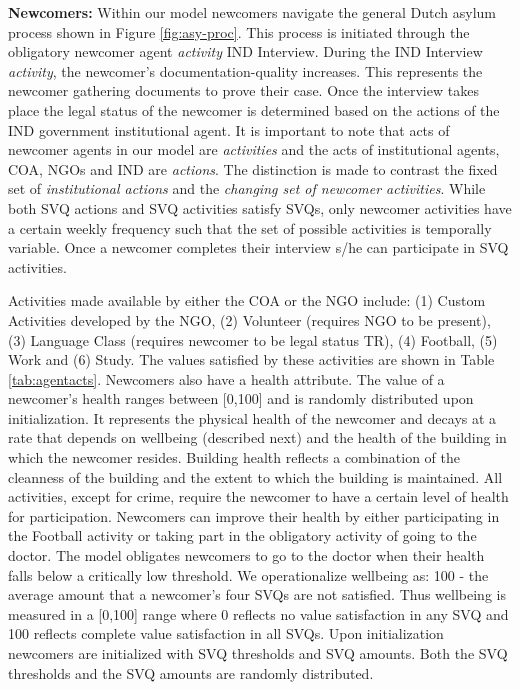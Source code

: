 \documentclass{scspaperproc}
\theoremstyle{scsthe}
\begin{document}
{\bf Newcomers:} Within our model newcomers navigate the general Dutch asylum process shown in Figure \ref{fig:asy-proc}. This process is initiated through the obligatory newcomer agent \emph{activity} IND Interview. During the IND Interview \emph{activity}, the newcomer's documentation-quality increases. This represents the newcomer gathering documents to prove their case. Once the interview takes place the legal status of the newcomer is determined based on the actions of the IND government institutional agent. It is important to note that acts of newcomer agents in our model are \emph{activities} and the acts of institutional agents, COA, NGOs and IND are \emph{actions}. The distinction is made to contrast the fixed set of \emph{institutional actions} and the \emph{changing set of newcomer activities}. While both SVQ actions and SVQ activities satisfy SVQs, only newcomer activities have a certain weekly frequency such that the set of possible activities is temporally variable. Once a newcomer completes their interview s/he can participate in SVQ activities. 

Activities made available by either the COA or the NGO include: (1) Custom Activities developed by the NGO, (2) Volunteer (requires NGO to be present), (3) Language Class (requires newcomer to be legal status TR), (4) Football, (5) Work and (6) Study. The values satisfied by these activities are shown in Table \ref{tab:agentacts}. Newcomers also have a health attribute. The value of a newcomer's health ranges between [0,100] and is randomly distributed upon initialization. It represents the physical health of the newcomer and decays at a rate that depends on wellbeing (described next) and the health of the building in which the newcomer resides. Building health reflects a combination of the cleanness of the building and the extent to which the building is maintained. All activities, except for crime, require the newcomer to have a certain level of health for participation. Newcomers can improve their health by either participating in the Football activity or taking part in the obligatory activity of going to the doctor. The model obligates newcomers to go to the doctor when their health falls below a critically low threshold. We operationalize wellbeing as: 100 - the average amount that a newcomer's four SVQs are not satisfied. Thus wellbeing is measured in a [0,100] range where 0 reflects no value satisfaction in any SVQ and 100 reflects complete value satisfaction in all SVQs. Upon initialization newcomers are initialized with SVQ thresholds and SVQ amounts. Both the SVQ thresholds and the SVQ amounts are randomly distributed. %
\end{document}

